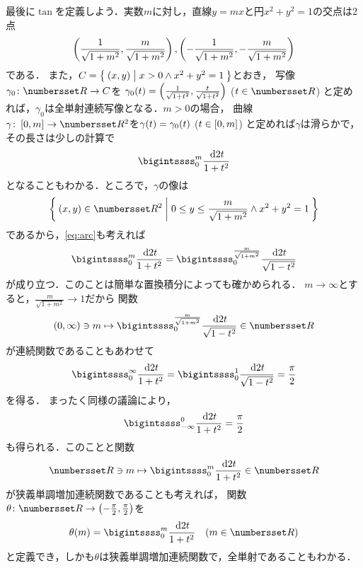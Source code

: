 \documentclass[11pt,a4paper]{ltjsarticle}
\newcommand*{\coord}[1]{\paren{#1}}
\newcommand*{\intd}{\dl2}
\theoremstyle{definition}
\begin{document}
最後に$\tan$を定義しよう．実数$m$に対し，直線$y = mx$と円$x^2 + y^2 = 1$の交点は2点
\begin{align}
  \coord{\frac{1}{\sqrt{1 + m^2}}, \frac{m}{\sqrt{1 + m^2}}},
  \coord{- \frac{1}{\sqrt{1 + m^2}}, - \frac{m}{\sqrt{1 + m^2}}}
  \label{eq:crosspoint}
\end{align}
である．
また，$C = \setintension{\coord{x,y}}{x > 0 \land x^2 + y^2 = 1}$とおき，
写像$\gamma_0 \colon \Real \to C$を
$\apply{\gamma_0}{t} = \coord{\frac{1}{\sqrt{1 + t^2}}, \frac{t}{\sqrt{1 + t^2}}}$ ($t \in \Real$)
と定めれば，$\gamma_0$は全単射連続写像となる．$m > 0$の場合，
曲線$\gamma \colon \interval{c}{0,m} \to \Real^2$を$\apply{\gamma}{t} = \apply{\gamma_0}{t}$ ($t \in \interval{c}{0,m}$)
と定めれば$\gamma$は滑らかで，その長さは少しの計算で
\begin{align}
  \bigintssss_0^m \frac{\intd t}{1 + t^2}
  \label{eq:anglearc}
\end{align}
となることもわかる．ところで，$\gamma$の像は
\[
  \setintension{\coord{x,y} \in \Real^2}{0 \leq y \leq \frac{m}{\sqrt{1 + m^2}} \land x^2 + y^2 = 1}
\]
であるから，\cref{eq:arc}も考えれば
\begin{align}
  \bigintssss_0^m \frac{\intd t}{1 + t^2} = \bigintssss_0^{\frac{m}{\sqrt{1 + m^2}}} \frac{\intd t}{\sqrt{1 - t^2}}
  \label{eq:angle}
\end{align}
が成り立つ．このことは簡単な置換積分によっても確かめられる．
$m \to \infty$とすると，$\frac{m}{\sqrt{1 + m^2}} \to 1$だから
関数
\[
  \interval{op}{0,\infty} \ni m \mapsto \bigintssss_0^{\frac{m}{\sqrt{1 + m^2}}} \frac{\intd t}{\sqrt{1 - t^2}} \in \Real
\]
が連続関数であることもあわせて
\begin{align}
  \bigintssss_0^{\infty} \frac{\intd t}{1 + t^2} = \bigintssss_0^1 \frac{\intd t}{\sqrt{1 - t^2}} = \frac{\pi}{2}
  \label{eq:piint}
\end{align}
を得る．
まったく同様の議論により，
\begin{align}
  \bigintssss_{-\infty}^0 \frac{\intd t}{1 + t^2} = \frac{\pi}{2}
  \label{eq:piint2}
\end{align}
も得られる．このことと関数
\begin{align*}
  \Real \ni m \mapsto \bigintssss_0^m \frac{\intd t}{1 + t^2} \in \Real
\end{align*}
が狭義単調増加連続関数であることも考えれば，
関数$\theta \colon \Real \to \interval{op}{-\frac{\pi}{2}, \frac{\pi}{2}}$を
\begin{align}
  \apply{\theta}{m} = \bigintssss_0^m \frac{\intd t}{1 + t^2} \quad \text{($m \in \Real$)}
  \label{eq:arctanfunc}
\end{align}
と定義でき，しかも$\theta$は狭義単調増加連続関数で，全単射であることもわかる．
\end{document}
